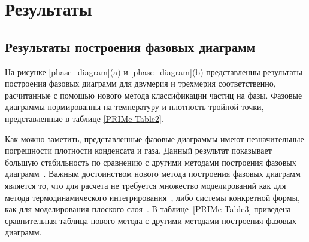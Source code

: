 \section{Результаты}
\label{PRIMe-SecResults}

\subsection{Результаты построения фазовых диаграмм}
\label{PRIMe-SubSecPhaseDiagramMD}

На рисунке \ref{phase_diagram}(a) и \ref{phase_diagram}(b) представленны результаты построения фазовых диаграмм для двумерия и трехмерия соответственно, расчитанные с помощью нового метода классификации частиц на фазы.
Фазовые диаграммы нормированны на температуру и плотность тройной точки, представленные в таблице \ref{PRIMe-Table2}.

Как можно заметить, представленные фазовые диаграммы имеют незначительные погрешности плотности конденсата и газа.
Данный результат показывает большую стабильность по сравнению с другими методами построения фазовых диаграмм~\cite{10.1021/jp806127j, 10.1021/jp1117213}.
Важным достоинством нового метода построения фазовых диаграмм является то, что для расчета не требуется множество моделирований как для метода термодинамического интегрирования~\cite{10.1080/00268976.2019.1699185}, либо системы конкретной формы, как для моделирования плоского слоя~\cite{10.1021/jp806127j, 10.1021/jp1117213}.
В таблице~\ref{PRIMe-Table3} приведена сравнительная таблица нового метода с другими методами построения фазовых диаграмм.



\begin{table}[h!]
    \caption{Сравнение различных методов построения фазовых диаграмм. Под 2D и 3D понимается применимость данных методов в двумерных или трехмерных системах; под скоростью подразумевается величина затраченого времени в человеко-часах на одну точку фазовой диаграммы относительно других представленных методов; под точностью понимается точность метода относительно других представленных методов.}
    \label{PRIMe-Table3}
\end{table}



